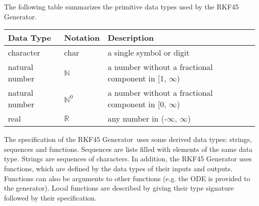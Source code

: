 \documentclass[12pt, titlepage]{article}
\newcommand{\progname}{the RKF45 Generator\xspace}
\begin{document}
The following table summarizes the primitive data types used by \progname. 

\begin{center}
  \renewcommand{\arraystretch}{1.2}
  \noindent 
  \begin{tabular}{l l p{7.5cm}} 
    \toprule 
    \textbf{Data Type} & \textbf{Notation} & \textbf{Description}\\ 
    \midrule
    character & char & a single symbol or digit\\
    natural number & $\mathbb{N}$ & a number without a fractional component in 
    [1, $\infty$) \\
    natural number & $\mathbb{N}^0$ & a number without a fractional component 
    in 
    [0, $\infty$) \\
    real & $\mathbb{R}$ & any number in (-$\infty$, $\infty$)\\
    \bottomrule
  \end{tabular} 
\end{center}

\noindent
The specification of \progname \ uses some derived data types: strings, 
sequences and functions. 
Sequences are lists filled with elements of the same data type.
Strings are sequences of characters. 
In addition, \progname uses functions, which are defined by the data types of 
their inputs and outputs. Functions can also be arguments to other functions 
(e.g. the ODE is provided to the generator). 
Local functions are described by giving their type signature followed by their 
specification.
\end{document}
